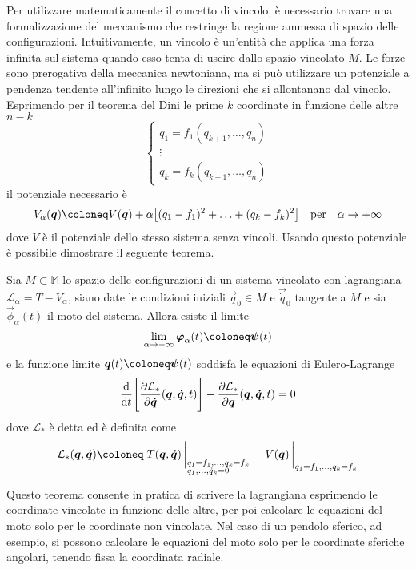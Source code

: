 Per utilizzare matematicamente il concetto di vincolo, è necessario trovare una formalizzazione del meccanismo che restringe la regione ammessa di spazio delle configurazioni. Intuitivamente, un vincolo è un'entità che applica una forza infinita sul sistema quando esso tenta di uscire dallo spazio vincolato $M$. Le forze sono prerogativa della meccanica newtoniana, ma si può utilizzare un potenziale a pendenza tendente all'infinito lungo le direzioni che si allontanano dal vincolo. Esprimendo per il teorema del Dini le prime $k$ coordinate in funzione delle altre $n-k$ \begin{equation}
\begin{cases}
  q_1 = f_1(q_{k+1}, \ldots, q_n) \\
  \vdots \\
  q_k = f_k(q_{k+1}, \ldots, q_n)
\end{cases}
\end{equation} 
il potenziale necessario è \begin{equation}
  V_{\alpha}(\vec{q}) \defeq V(\vec{q}) + \alpha\big[(q_1-f_1)^2 + \ldots + (q_k-f_k)^2 \big] \qqtext{per} \alpha \to +\infty
\end{equation} 
dove $V$ è il potenziale dello stesso sistema senza vincoli. Usando questo potenziale è possibile dimostrare il seguente teorema.
\begin{theorem}
  Sia $M \subset \mathbb{M}$ lo spazio delle configurazioni di un sistema vincolato con lagrangiana $\mathcal{L}_{\alpha} = T -V_{\alpha}$, siano date le condizioni iniziali $\vec{q}_0 \in  M$ e $\vec{\dot{q}}_0$ tangente a $M$ e sia $\vec{\phi}_{\alpha}(t)$ il moto del sistema. Allora esiste il limite \begin{equation}
  \lim_{\alpha \to +\infty} \vec{\phi}_{\alpha}(t) \defeq \vec{\psi}(t)
  \end{equation} 
  e la funzione limite $\vec{q}(t) \defeq \vec{\psi}(t)$ soddisfa le equazioni di Eulero-Lagrange \begin{equation}
    \dv{t}\Bigg[\pdv{\mathcal{L}_{*}}{\boldsymbol{\dot{q}}}()(\boldsymbol{q},\boldsymbol{\dot{q}},t)\Bigg] - \pdv{\mathcal{L}_{*}}{\boldsymbol{q}}()(\boldsymbol{q},\boldsymbol{\dot{q}},t) = 0
  \end{equation} 
  dove $\mathcal{L}_*$ è detta  ed è definita come \begin{equation}
  \mathcal{L}_*(\vec{q},\vec{\dot{q}}) \defeq \eval{T(\vec{q},\vec{\dot{q}})\,}_{\begin{subarray}{l}
    q_1=f_1, \ldots, q_k=f_k \\
    \dot{q}_1, \ldots, \dot{q}_k = 0
  \end{subarray}} - \eval{V(\vec{q})\,}_{q_1=f_1, \ldots, q_k=f_k}
  \end{equation} 
\end{theorem} 
Questo teorema consente in pratica di scrivere la lagrangiana esprimendo le coordinate vincolate in funzione delle altre, per poi calcolare le equazioni del moto solo per le coordinate non vincolate. Nel caso di un pendolo sferico, ad esempio, si possono calcolare le equazioni del moto solo per le coordinate sferiche angolari, tenendo fissa la coordinata radiale.

